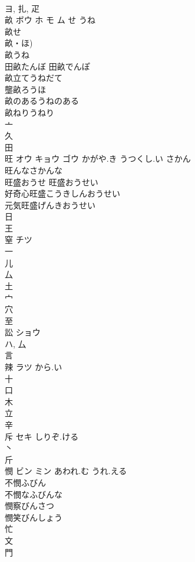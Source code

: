 \documentclass[8pt]{extreport}
\begin{document}
\begin{CJK}{UTF8}{min}
\\	ヨ, 扎, 疋 
\\	畝	ボウ ホ モ ム	せ うね	
\\	畝せ 
\\	畝・ほ) 
\\	畝うね 
\\	田畝たんぼ 田畝でんぽ 
\\	畝立てうねだて 
\\	壟畝ろうほ 
\\	畝のあるうねのある 
\\	畝ねりうねり 
\\	亠 
\\	久 
\\	田 
\\	旺	オウ キョウ ゴウ	かがや.き うつくし.い さかん	
\\	旺んなさかんな 
\\	旺盛おうせ 旺盛おうせい 
\\	好奇心旺盛こうきしんおうせい 
\\	元気旺盛げんきおうせい 
\\	日 
\\	王 
\\	窒	チツ		
\\	一 
\\	儿 
\\	厶 
\\	土 
\\	宀 
\\	穴 
\\	至 
\\	訟	ショウ		
\\	ハ, 厶 
\\	言 
\\	辣	ラツ	から.い	
\\	十 
\\	口 
\\	木 
\\	立 
\\	辛 
\\	斥	セキ	しりぞ.ける	
\\	丶 
\\	斤 
\\	憫	ビン ミン	あわれ.む うれ.える	
\\	不憫ふびん
\\	不憫なふびんな
\\	憫察びんさつ
\\	憫笑びんしょう
\\	忙 
\\	文 
\\	門 

\end{CJK}
\end{document}
